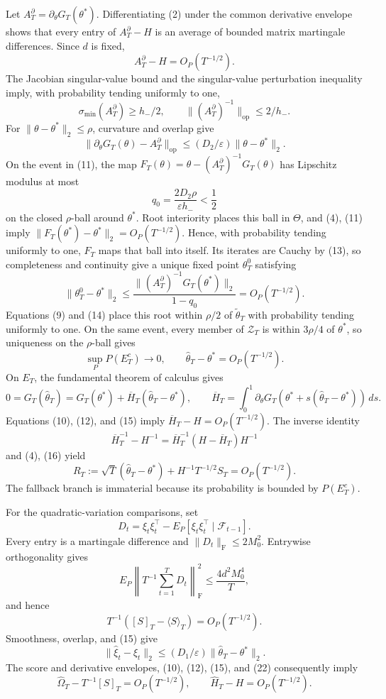 Let \(A_T^\partial=\partial_\theta G_T(\theta^*)\).  Differentiating (2)
under the common derivative envelope shows that every entry of
\(A_T^\partial-H\) is an average of bounded matrix martingale differences.
Since \(d\) is fixed,
\[
 A_T^\partial-H=O_P(T^{-1/2}).
\tag{10}
\]
The Jacobian singular-value bound and the singular-value perturbation
inequality imply, with probability tending uniformly to one,
\[
 \sigma_{\min}(A_T^\partial)\ge h_-/2,
 \qquad \|(A_T^\partial)^{-1}\|_{\mathrm{op}}\le2/h_-.
\tag{11}
\]
For \(\|\theta-\theta^*\|_2\le\rho\), curvature and overlap give
\[
 \|\partial_\theta G_T(\theta)-A_T^\partial\|_{\mathrm{op}}
 \le(D_2/\varepsilon)\|\theta-\theta^*\|_2.
\tag{12}
\]
On the event in (11), the map
\(F_T(\theta)=\theta-(A_T^\partial)^{-1}G_T(\theta)\) has Lipschitz modulus at
most
\[
 q_0=\frac{2D_2\rho}{\varepsilon h_-}<\frac12
\tag{13}
\]
on the closed \(\rho\)-ball around \(\theta^*\).  Root interiority places
this ball in \(\Theta\), and (4), (11) imply
\(\|F_T(\theta^*)-\theta^*\|_2=O_P(T^{-1/2})\).  Hence, with probability
tending uniformly to one, \(F_T\) maps that ball into itself.  Its iterates
are Cauchy by (13), so completeness and continuity give a unique fixed point
\(\theta_T^0\) satisfying
\[
 \|\theta_T^0-\theta^*\|_2
 \le\frac{\|(A_T^\partial)^{-1}G_T(\theta^*)\|_2}{1-q_0}
 =O_P(T^{-1/2}).
\tag{14}
\]
Equations (9) and (14) place this root within \(\rho/2\) of
\(\widetilde\theta_T\) with probability tending uniformly to one.  On the
same event, every member of \(\mathcal Z_T\) is within \(3\rho/4\) of
\(\theta^*\), so uniqueness on the \(\rho\)-ball gives
\[
 \sup_P P(E_T^c)\longrightarrow0,
 \qquad \widehat\theta_T-\theta^*=O_P(T^{-1/2}).
\tag{15}
\]
On \(E_T\), the fundamental theorem of calculus gives
\[
 0=G_T(\widehat\theta_T)=G_T(\theta^*)+\overline H_T
 (\widehat\theta_T-\theta^*),
 \qquad
 \overline H_T=\int_0^1\partial_\theta G_T
 (\theta^*+s(\widehat\theta_T-\theta^*))\,ds.
\tag{16}
\]
Equations (10), (12), and (15) imply
\(\overline H_T-H=O_P(T^{-1/2})\).  The inverse identity
\[
 \overline H_T^{-1}-H^{-1}
 =\overline H_T^{-1}(H-\overline H_T)H^{-1}
\tag{17}
\]
and (4), (16) yield
\[
 R_T:=\sqrt T(\widehat\theta_T-\theta^*)
 +H^{-1}T^{-1/2}S_T=O_P(T^{-1/2}).
\tag{18}
\]
The fallback branch is immaterial because its probability is bounded by
\(P(E_T^c)\).

For the quadratic-variation comparisons, set
\[
 D_t=\xi_t\xi_t^\top-E_P[\xi_t\xi_t^\top\mid\mathcal F_{t-1}].
\tag{19}
\]
Every entry is a martingale difference and
\(\|D_t\|_{\mathrm F}\le2M_0^2\).  Entrywise orthogonality gives
\[
 E_P\left\|T^{-1}\sum_{t=1}^TD_t\right\|_{\mathrm F}^2
 \le\frac{4d^2M_0^4}{T},
\tag{20}
\]
and hence
\[
 T^{-1}([S]_T-\langle S\rangle_T)=O_P(T^{-1/2}).
\tag{21}
\]
Smoothness, overlap, and (15) give
\[
 \|\widehat\xi_t-\xi_t\|_2
 \le(D_1/\varepsilon)\|\widehat\theta_T-\theta^*\|_2.
\tag{22}
\]
The score and derivative envelopes, (10), (12), (15), and (22) consequently
imply
\[
 \widehat\Omega_T-T^{-1}[S]_T=O_P(T^{-1/2}),
 \qquad \widehat H_T-H=O_P(T^{-1/2}).
\tag{23}
\]

